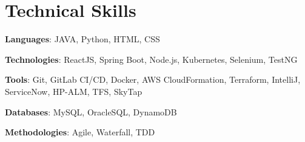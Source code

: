 \documentclass[letterpaper,11pt]{article}
\begin{document}
\section{Technical Skills}
\begin{itemize}[leftmargin=0.15in, label={}]
\small{
\item \textbf{Languages}: JAVA, Python, HTML, CSS
\item \textbf{Technologies}: ReactJS, Spring Boot, Node.js, Kubernetes, Selenium, TestNG
\item \textbf{Tools}: Git, GitLab CI/CD, Docker, AWS CloudFormation, Terraform, IntelliJ, ServiceNow, HP-ALM, TFS, SkyTap
\item \textbf{Databases}: MySQL, OracleSQL, DynamoDB
\item \textbf{Methodologies}: Agile, Waterfall, TDD
}
\end{itemize}

\end{document}
